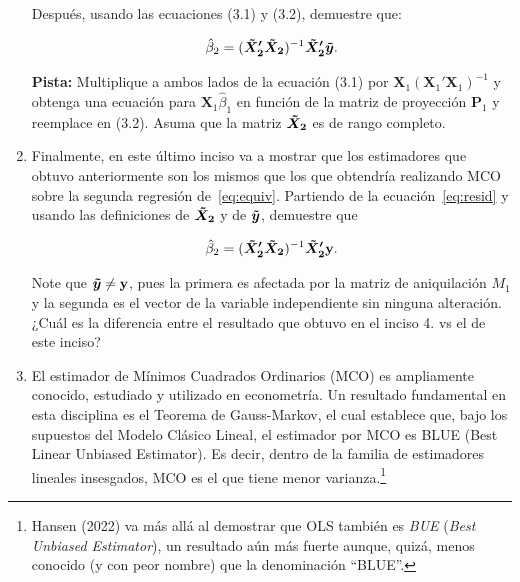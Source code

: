 \documentclass[a4paper, answers, addpoints, 11pt]{exam}
\begin{document}
\begin{enumerate}
    \bigskip Después, usando las ecuaciones (3.1) y (3.2), demuestre que:
    
    \begin{equation}\label{eq:resid}
        \hat\beta_2 = (\boldsymbol{\Tilde{X}_2'}\boldsymbol{\Tilde{X}_2})^{-1}\boldsymbol{\Tilde{X}_2'}\boldsymbol{\Tilde{y}}.
    \end{equation}

    \textbf{Pista:} Multiplique a ambos lados de la ecuación (3.1) por $\textbf{X}_1(\textbf{X}_1'\textbf{X}_1)^{-1}$ y obtenga una ecuación para $\textbf{X}_1\hat\beta_1$ en función de la matriz de proyección $\textbf{P}_1$ y reemplace en (3.2). Asuma que la matriz $\boldsymbol{\Tilde{X}_2}$ es de rango completo. 

    \bigskip

    \item Finalmente, en este último inciso va a mostrar que los estimadores que obtuvo anteriormente son los mismos que los que obtendría realizando MCO sobre la segunda regresión de~\eqref{eq:equiv}. Partiendo de la ecuación~\eqref{eq:resid} y usando las definiciones de  $\boldsymbol{\Tilde{X}_2}$ y de  $\boldsymbol{\Tilde{y}}$, demuestre que

    \begin{equation}
        \hat\beta_2 = (\boldsymbol{\Tilde{X}_2'}\boldsymbol{\Tilde{X}_2})^{-1}\boldsymbol{\Tilde{X}_2'}\textbf{y}.
    \end{equation}

    Note que $\boldsymbol{\Tilde{y}} \neq \textbf{y}$, pues la primera es afectada por la matriz de aniquilación $M_1$ y la segunda es el vector de la variable independiente sin ninguna alteración. ¿Cuál es la diferencia entre el resultado que obtuvo en el inciso 4. vs el de este inciso?


    \item El estimador de Mínimos Cuadrados Ordinarios (MCO) es ampliamente conocido, estudiado y utilizado en econometría. Un resultado fundamental en esta disciplina es el Teorema de Gauss-Markov, el cual establece que, bajo los supuestos del Modelo Clásico Lineal, el estimador por MCO es BLUE (Best Linear Unbiased Estimator). Es decir, dentro de la familia de estimadores lineales insesgados, MCO es el que tiene menor varianza.\footnote{Hansen (2022) va más allá al demostrar que OLS también es \textit{BUE} (\textit{Best Unbiased Estimator}), un resultado aún más fuerte aunque, quizá, menos conocido (y con peor nombre) que la denominación ``BLUE''.}  
    

\end{enumerate}
\end{document}
